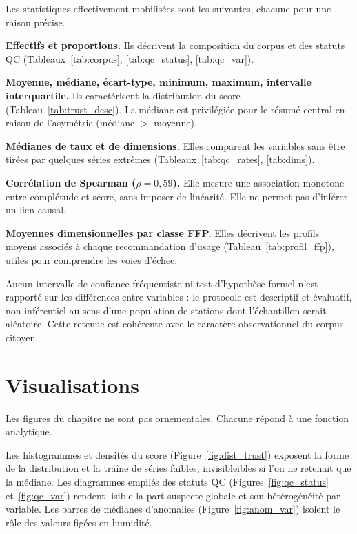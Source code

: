 Les statistiques effectivement mobilisées sont les suivantes, chacune pour une
raison précise.

\textbf{Effectifs et proportions.} Ils décrivent la composition du corpus et des
statuts QC (Tableaux~\ref{tab:corpus}, \ref{tab:qc_status}, \ref{tab:qc_var}).

\textbf{Moyenne, médiane, écart-type, minimum, maximum, intervalle
interquartile.} Ils caractérisent la distribution du score
(Tableau~\ref{tab:trust_desc}). La médiane est privilégiée pour le résumé
central en raison de l'asymétrie (médiane $>$ moyenne).

\textbf{Médianes de taux et de dimensions.} Elles comparent les variables sans
être tirées par quelques séries extrêmes (Tableaux~\ref{tab:qc_rates},
\ref{tab:dims}).

\textbf{Corrélation de Spearman ($\rho=0,59$).} Elle mesure une association
monotone entre complétude et score, sans imposer de linéarité. Elle ne permet
pas d'inférer un lien causal.

\textbf{Moyennes dimensionnelles par classe FFP.} Elles décrivent les profils
moyens associés à chaque recommandation d'usage
(Tableau~\ref{tab:profil_ffp}), utiles pour comprendre les voies d'échec.

Aucun intervalle de confiance fréquentiste ni test d'hypothèse formel n'est
rapporté sur les différences entre variables : le protocole est descriptif et
évaluatif, non inférentiel au sens d'une population de stations dont l'échantillon
serait aléatoire. Cette retenue est cohérente avec le caractère observationnel
du corpus citoyen.

\section{Visualisations}
\label{sec:visualisations}

Les figures du chapitre ne sont pas ornementales. Chacune répond à une fonction
analytique.

Les histogrammes et densités du score (Figure~\ref{fig:dist_trust}) exposent la
forme de la distribution et la traîne de séries faibles, invisibleibles si l'on
ne retenait que la médiane. Les diagrammes empilés des statuts QC
(Figures~\ref{fig:qc_status} et~\ref{fig:qc_var}) rendent lisible la part
suspecte globale et son hétérogénéité par variable. Les barres de médianes
d'anomalies (Figure~\ref{fig:anom_var}) isolent le rôle des valeurs figées en
humidité.

